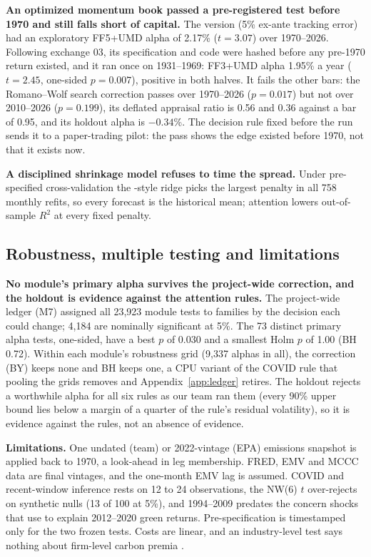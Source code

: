 \textbf{An optimized momentum book passed a pre-registered test before 1970 and still falls short of capital.} The \citet{gk2000} version (5\% ex-ante tracking error) had an exploratory FF5+UMD alpha of 2.17\% ($t=3.07$) over 1970--2026. Following exchange 03, its specification and code were hashed before any pre-1970 return existed, and it ran once on 1931--1969: FF3+UMD alpha 1.95\% a year ($t=2.45$, one-sided $p=0.007$), positive in both halves. It fails the other bars: the Romano--Wolf search correction \citep{rw2005} passes over 1970--2026 ($p=0.017$) but not over 2010--2026 ($p=0.199$), its deflated appraisal ratio \citep[discounted for the number of strategies tried;][]{bldp2014} is 0.56 and 0.36 against a bar of 0.95, and its holdout alpha is $-0.34$\%. The decision rule fixed before the run sends it to a paper-trading pilot: the pass shows the edge existed before 1970, not that it exists now.

\textbf{A disciplined shrinkage model refuses to time the spread.} Under pre-specified cross-validation the \citet{lmn2024}-style ridge picks the largest penalty in all 758 monthly refits, so every forecast is the historical mean; attention lowers out-of-sample $R^2$ at every fixed penalty.

\subsection{Robustness, multiple testing and limitations}
\label{sec:robust}

\textbf{No module's primary alpha survives the project-wide correction, and the holdout is evidence against the attention rules.} The project-wide ledger (M7) assigned all 23,923 module tests to families by the decision each could change; 4,184 are nominally significant at 5\%. The 73 distinct primary alpha tests, one-sided, have a best $p$ of 0.030 and a smallest Holm $p$ of 1.00 (BH 0.72). Within each module's robustness grid (9,337 alphas in all), the \citet{by2001} correction (BY) keeps none and BH keeps one, a CPU variant of the COVID rule that pooling the grids removes and Appendix~\ref{app:ledger} retires. The holdout rejects a worthwhile alpha for all six rules as our team ran them (every 90\% upper bound lies below a margin of a quarter of the rule's residual volatility), so it is evidence against the rules, not an absence of evidence.

\textbf{Limitations.} One undated (team) or 2022-vintage (EPA) emissions snapshot is applied back to 1970, a look-ahead in leg membership. FRED, EMV and MCCC data are final vintages, and the one-month EMV lag is assumed. COVID and recent-window inference rests on 12 to 24 observations, the NW(6) $t$ over-rejects on synthetic nulls (13 of 100 at 5\%), and 1994--2009 predates the concern shocks that \citet{pst2022} use to explain 2012--2020 green returns. Pre-specification is timestamped only for the two frozen tests. Costs are linear, and an industry-level test says nothing about firm-level carbon premia \citep{bk2021}.

